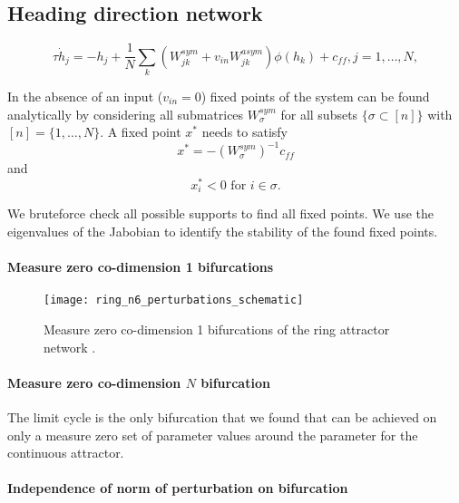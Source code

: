 \documentclass{article} %
\newcounter{ct}
\theoremstyle{definition}
\theoremstyle{remark}
\begin{document}
\subsection{Heading direction network}\label{sec:supp:headdirection}

\begin{equation}
\tau \dot h_j = -h_j + \frac{1}{N} \sum_k (W^{sym}_{jk} + v_{in} W^{asym}_{jk})\phi(h_k)+c_{ff},     j=1,\dots,N,
\end{equation}

In the absence of an input ($v_{in}=0$) fixed points of the system can be found analytically by considering all submatrices $W^{sym}_\sigma$ for all subsets $\{\sigma\subset [n]\}$ with$[n]=\{1,\dots, N\}$.
A fixed point $x^*$ needs to satisfy
\begin{equation}
x^*= -(W^{sym}_\sigma)^{-1}c_{ff}
\end{equation}
and 
\begin{equation}
x^*_i<0 \text{   for  	 } i\in\sigma.
\end{equation}

We bruteforce check all possible supports to find all fixed points.
We use the eigenvalues of the Jabobian to identify the stability of the found fixed points.


\paragraph{Measure zero co-dimension 1 bifurcations}

\begin{figure}[tbhp]
     \centering
    \texttt{[image: ring\_n6\_perturbations\_schematic]}
       \caption{Measure zero co-dimension 1 bifurcations of the ring attractor network \citep{Noorman2022}.}
         \label{fig:meaure_zero_perturbations}
\end{figure}


\paragraph{Measure zero co-dimension $N$ bifurcation}
The limit cycle is the only bifurcation that we found that can be achieved on only a measure zero set of parameter values around the parameter for the continuous attractor.



\paragraph{Independence of norm of perturbation on bifurcation}
\end{document}
